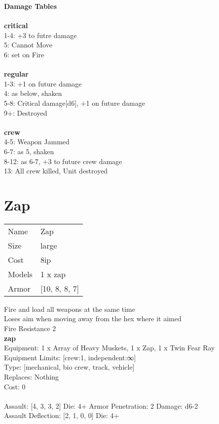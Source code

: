 {\bf Damage Tables} \\
\ \\ {\bf critical } \\
1-4: +3 to futre damage \\
5: Cannot Move \\
6: set on Fire \\
\ \\ {\bf regular } \\
1-3: +1 on future damage \\
4: as below, shaken \\
5-8: Critical damage[d6], +1 on future damage \\
9+: Destroyed \\
\ \\ {\bf crew } \\
4-5: Weapon Jammed \\
6-7: as 5, shaken \\
8-12: as 6-7, +3 to future crew damage \\
13: All crew killed, Unit destroyed \\










\pagebreak\pagebreak

\section{ Zap }

\begin{tabular}{ll}
  Name & Zap \\
  Size & large\\
  Cost & 8ip\\
  Models & 1 x zap\\
  Armor & [10, 8, 8, 7]\\
\end{tabular}

\noindent Fire and load all weapons at the same time\\ 
Loses aim when moving away from the hex where it aimed\\ 
Fire Resistance 2\\ 


{\bf zap } \\
Equipment: 1 x Array of Heavy Muskets, 1 x Zap, 1 x Twin Fear Ray \\
Equipment Limits: [crew:1, independent:∞] \\
Type: [mechanical, bio crew, track, vehicle] \\
Replaces: Nothing \\
Cost: 0\\
\ \\
Assault: [4, 3, 3, 2] Die: 4+ Armor Penetration: 2 Damage: d6-2 \\
Assault Deflection: [2, 1, 0, 0] Die: 4+\\
\indent  
\ \\

